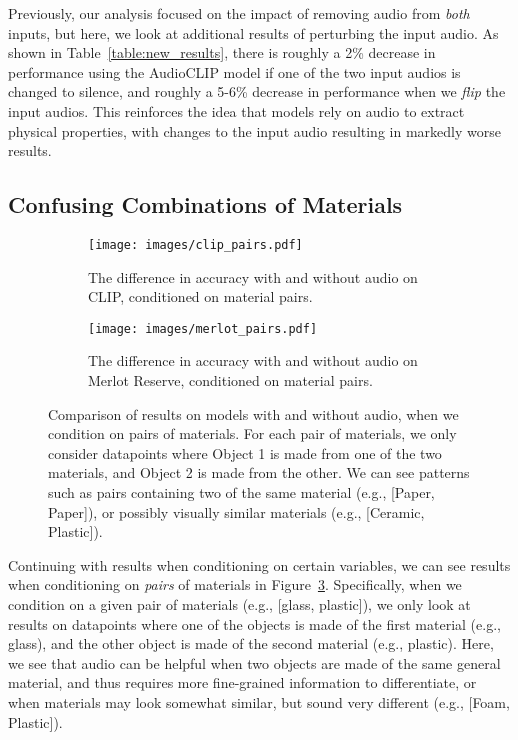 \documentclass[runningheads]{llncs}
\begin{document}
Previously, our analysis focused on the impact of removing audio from \textit{both} inputs, but here, we look at additional results of perturbing the input audio. As shown in Table~\ref{table:new_results}, there is roughly a 2\% decrease in performance using the AudioCLIP model if one of the two input audios is changed to silence, and roughly a 5-6\% decrease in performance when we \textit{flip} the input audios. This reinforces the idea that models rely on audio to extract physical properties, with changes to the input audio resulting in markedly worse results.

\subsection{Confusing Combinations of Materials}

\begin{figure}[t]
    \begin{subfigure}{0.48\textwidth}
        \centering
        \texttt{[image: images/clip\_pairs.pdf]}
        \caption{The difference in accuracy with and without audio on CLIP, conditioned on material pairs. }
        \label{fig:mat_pairs_clip}
    \end{subfigure}
    \hfill
    \begin{subfigure}{0.48\textwidth}
        \centering
        \texttt{[image: images/merlot\_pairs.pdf]}
        \caption{The difference in accuracy with and without audio on Merlot Reserve, conditioned on material pairs. }
        \label{fig:mat_pairs_merlot}
    \end{subfigure}
    \caption{Comparison of results on models with and without audio, when we condition on pairs of materials. For each pair of materials, we only consider datapoints where Object 1 is made from one of the two materials, and Object 2 is made from the other. We can see patterns such as pairs containing two of the same material (e.g., [Paper, Paper]), or possibly visually similar materials (e.g., [Ceramic, Plastic]).}
    \label{fig:mat_pairs_comp}
\end{figure}

Continuing with results when conditioning on certain variables, we can see results when conditioning on \textit{pairs} of materials in Figure~\ref{fig:mat_pairs_comp}. Specifically, when we condition on a given pair of materials (e.g., [glass, plastic]), we only look at results on datapoints where one of the objects is made of the first material (e.g., glass), and the other object is made of the second material (e.g., plastic). Here, we see that audio can be helpful when two objects are made of the same general material, and thus requires more fine-grained information to differentiate, or when materials may look somewhat similar, but sound very different (e.g., [Foam, Plastic]). 
\end{document}

